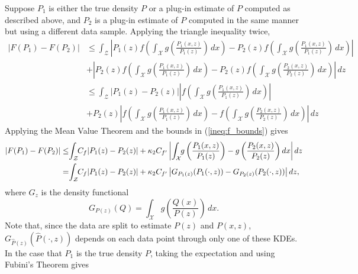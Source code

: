 \documentclass{article} %
\newcommand{\X}{\mathcal{X}}                        %
\newcommand{\Z}{\mathcal{Z}}                        %
\begin{document}
Suppose $P_1$ is either the true density $P$ or a plug-in estimate of $P$
computed as described above, and $P_2$ is a plug-in estimate of $P$ computed in
the same manner but using a different data sample.
Applying the triangle inequality twice,
\begin{align*}
|F(P_1) - F(P_2)|
 &  \leq
    \int_\Z
        \left| P_1(z) f\left(
                    \int_\X g\left(\frac{P_1(x,z)}{P_1(z)} \right) \, dx \right)
            - P_2(z) f\left(
                    \int_\X g\left(\frac{P_1(x,z)}{P_1(z)} \right) \, dx \right)
        \right|
   \\
 &  +
        \left| P_2(z) f\left(
                    \int_\X g\left(\frac{P_1(x,z)}{P_1(z)} \right) \, dx \right)
            - P_2(z) f\left(
                    \int_\X g\left(\frac{P_2(x,z)}{P_2(z)} \right) \, dx \right)
        \right| \, dz   \\
 &  \leq
    \int_\Z
        |P_1(z) - P_2(z)|
        \left|
            f\left( \int_\X g\left(\frac{P_1(x,z)}{P_1(z)} \right) \, dx \right)
        \right|
   \\
 &  + P_2(z)
        \left| f\left(
                    \int_\X g\left(\frac{P_1(x,z)}{P_1(z)} \right) \, dx \right)
            - f\left(
                    \int_\X g\left(\frac{P_2(x,z)}{P_2(z)} \right) \, dx \right)
        \right| \, dz
\end{align*}
Applying the Mean Value Theorem and the bounds in (\ref{ineq:f_bounds}) gives
\begin{align*}
|F(P_1) - F(P_2)|
 &  \leq \hspace{-1mm}\int_\Z\hspace{-1mm}C_f|P_1(z) - P_2(z)|
    + \kappa_2C_{f'}
        \left| \int_\X \hspace{-1mm}g\left(\frac{P_1(x,z)}{P_1(z)} \right)
            - g\left(\frac{P_2(x,z)}{P_2(z)} \right) dx
        \right| dz  \\
 &  = \hspace{-1mm}\int_\Z\hspace{-1mm}C_f |P_1(z) - P_2(z)|
    + \kappa_2C_{f'} \left| G_{P_1(z)}(P_1(\cdot,z)) - G_{P_2(z)}(P_2(\cdot,z)) \right| dz,
\end{align*}
where $G_z$ is the density functional
\[G_{P(z)}(Q) = \int_\X g\left( \frac{Q(x)}{P(z)} \right) \, dx.\]
Note that, since the data are split to estimate $P(z)$ and $P(x,z)$,
$G_{\hat P(z)}(\hat P(\cdot,z))$ depends on each data point through only one of
these KDEs. In the case that $P_1$ is the true density $P$, taking the
expectation and using Fubini's Theorem gives
\end{document}
